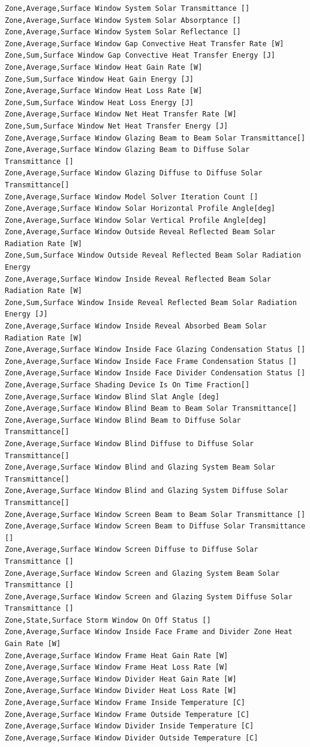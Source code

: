 \begin{lstlisting}
Zone,Average,Surface Window System Solar Transmittance []
Zone,Average,Surface Window System Solar Absorptance []
Zone,Average,Surface Window System Solar Reflectance []
Zone,Average,Surface Window Gap Convective Heat Transfer Rate [W]
Zone,Sum,Surface Window Gap Convective Heat Transfer Energy [J]
Zone,Average,Surface Window Heat Gain Rate [W]
Zone,Sum,Surface Window Heat Gain Energy [J]
Zone,Average,Surface Window Heat Loss Rate [W]
Zone,Sum,Surface Window Heat Loss Energy [J]
Zone,Average,Surface Window Net Heat Transfer Rate [W]
Zone,Sum,Surface Window Net Heat Transfer Energy [J]
Zone,Average,Surface Window Glazing Beam to Beam Solar Transmittance[]
Zone,Average,Surface Window Glazing Beam to Diffuse Solar Transmittance []
Zone,Average,Surface Window Glazing Diffuse to Diffuse Solar Transmittance[]
Zone,Average,Surface Window Model Solver Iteration Count []
Zone,Average,Surface Window Solar Horizontal Profile Angle[deg]
Zone,Average,Surface Window Solar Vertical Profile Angle[deg]
Zone,Average,Surface Window Outside Reveal Reflected Beam Solar Radiation Rate [W]
Zone,Sum,Surface Window Outside Reveal Reflected Beam Solar Radiation Energy
Zone,Average,Surface Window Inside Reveal Reflected Beam Solar Radiation Rate [W]
Zone,Sum,Surface Window Inside Reveal Reflected Beam Solar Radiation Energy [J]
Zone,Average,Surface Window Inside Reveal Absorbed Beam Solar Radiation Rate [W]
Zone,Average,Surface Window Inside Face Glazing Condensation Status []
Zone,Average,Surface Window Inside Face Frame Condensation Status []
Zone,Average,Surface Window Inside Face Divider Condensation Status []
Zone,Average,Surface Shading Device Is On Time Fraction[]
Zone,Average,Surface Window Blind Slat Angle [deg]
Zone,Average,Surface Window Blind Beam to Beam Solar Transmittance[]
Zone,Average,Surface Window Blind Beam to Diffuse Solar Transmittance[]
Zone,Average,Surface Window Blind Diffuse to Diffuse Solar Transmittance[]
Zone,Average,Surface Window Blind and Glazing System Beam Solar Transmittance[]
Zone,Average,Surface Window Blind and Glazing System Diffuse Solar Transmittance[]
Zone,Average,Surface Window Screen Beam to Beam Solar Transmittance []
Zone,Average,Surface Window Screen Beam to Diffuse Solar Transmittance []
Zone,Average,Surface Window Screen Diffuse to Diffuse Solar Transmittance []
Zone,Average,Surface Window Screen and Glazing System Beam Solar Transmittance []
Zone,Average,Surface Window Screen and Glazing System Diffuse Solar Transmittance []
Zone,State,Surface Storm Window On Off Status []
Zone,Average,Surface Window Inside Face Frame and Divider Zone Heat Gain Rate [W]
Zone,Average,Surface Window Frame Heat Gain Rate [W]
Zone,Average,Surface Window Frame Heat Loss Rate [W]
Zone,Average,Surface Window Divider Heat Gain Rate [W]
Zone,Average,Surface Window Divider Heat Loss Rate [W]
Zone,Average,Surface Window Frame Inside Temperature [C]
Zone,Average,Surface Window Frame Outside Temperature [C]
Zone,Average,Surface Window Divider Inside Temperature [C]
Zone,Average,Surface Window Divider Outside Temperature [C]
\end{lstlisting}

